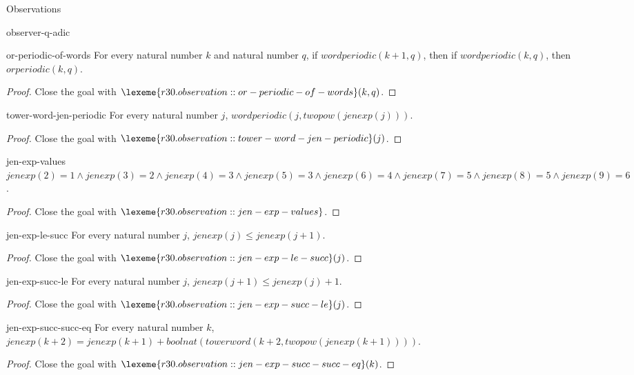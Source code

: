 \begin{lexlean}{Observations}
\begin{section}{observer-q-adic}
\begin{theorem}{or-periodic-of-words}
For every natural number \(k\) and natural number \(q\), if \(wordperiodic(k + 1, q)\), then if \(wordperiodic(k, q)\), then \(orperiodic(k, q)\).
\begin{proof}
Close the goal with \(\lexeme{r30.observation::or-periodic-of-words}(k, q)\).
\end{proof}
\end{theorem}

\begin{theorem}{tower-word-jen-periodic}
For every natural number \(j\), \(wordperiodic(j, twopow(jenexp(j)))\).
\begin{proof}
Close the goal with \(\lexeme{r30.observation::tower-word-jen-periodic}(j)\).
\end{proof}
\end{theorem}

\begin{theorem}{jen-exp-values}
\(jenexp(2) = 1 ∧ jenexp(3) = 2 ∧ jenexp(4) = 3 ∧ jenexp(5) = 3 ∧ jenexp(6) = 4 ∧ jenexp(7) = 5 ∧ jenexp(8) = 5 ∧ jenexp(9) = 6\).
\begin{proof}
Close the goal with \(\lexeme{r30.observation::jen-exp-values}\).
\end{proof}
\end{theorem}

\begin{theorem}{jen-exp-le-succ}
For every natural number \(j\), \(jenexp(j) ≤ jenexp(j + 1)\).
\begin{proof}
Close the goal with \(\lexeme{r30.observation::jen-exp-le-succ}(j)\).
\end{proof}
\end{theorem}

\begin{theorem}{jen-exp-succ-le}
For every natural number \(j\), \(jenexp(j + 1) ≤ jenexp(j) + 1\).
\begin{proof}
Close the goal with \(\lexeme{r30.observation::jen-exp-succ-le}(j)\).
\end{proof}
\end{theorem}

\begin{theorem}{jen-exp-succ-succ-eq}
For every natural number \(k\), \(jenexp(k + 2) = jenexp(k + 1) + boolnat(towerword(k + 2, twopow(jenexp(k + 1))))\).
\begin{proof}
Close the goal with \(\lexeme{r30.observation::jen-exp-succ-succ-eq}(k)\).
\end{proof}
\end{theorem}


\end{section}
\end{lexlean}
